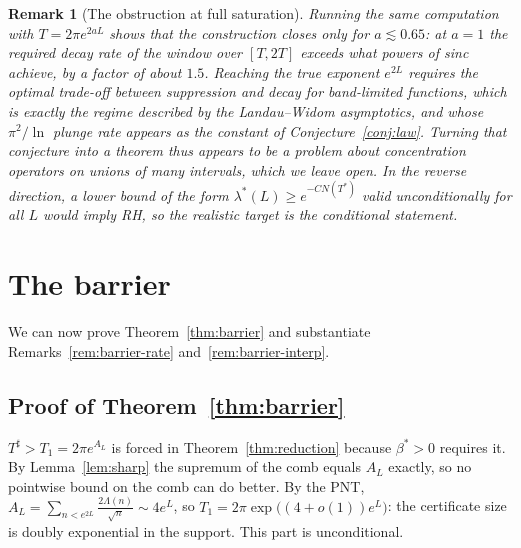 ﻿\documentclass[11pt]{article}
\newtheorem{remark}[theorem]{Remark}
\newcommand{\lmin}{\lambda^{*}}
\newcommand{\Tstar}{T^{*}}
\newcommand{\Tsharp}{T^{\sharp}}
\begin{document}
\begin{remark}[The obstruction at full saturation]\label{rem:obstruction}
Running the same computation with $T=2\pi e^{2aL}$ shows that the
construction closes only for $a\lesssim0.65$: at $a=1$ the required
decay rate of the window over $[T,2T]$ exceeds what powers of sinc
achieve, by a factor of about $1.5$.  Reaching the true exponent
$e^{2L}$ requires the optimal trade-off between suppression and decay
for band-limited functions, which is exactly the regime described by
the Landau--Widom asymptotics, and whose $\pi^{2}/\ln$ plunge rate
appears as the constant of Conjecture~\ref{conj:law}.  Turning that
conjecture into a theorem thus appears to be a problem about
concentration operators on unions of many intervals, which we leave
open.  In the reverse direction, a lower bound of the form
$\lmin(L)\ge e^{-CN(\Tstar)}$ valid unconditionally for all $L$ would
imply RH, so the realistic target is the conditional statement.
\end{remark}

\section{The barrier}\label{sec:barrier}

We can now prove Theorem~\ref{thm:barrier} and substantiate
Remarks~\ref{rem:barrier-rate} and~\ref{rem:barrier-interp}.

\subsection{Proof of Theorem~\ref{thm:barrier}}
$\Tsharp>T_1=2\pi e^{A_L}$ is forced in
Theorem~\ref{thm:reduction} because $\beta^*>0$ requires it.  By
Lemma~\ref{lem:sharp} the supremum of the comb equals $A_L$ exactly,
so no pointwise bound on the comb can do better.  By the PNT,
$A_L=\sum_{n<e^{2L}}\frac{2\Lambda(n)}{\sqrt n}\sim4e^L$, so
$T_1=2\pi\exp\bigl((4+o(1))e^L\bigr)$: the certificate size is doubly
exponential in the support.  This part is unconditional.
\end{document}
